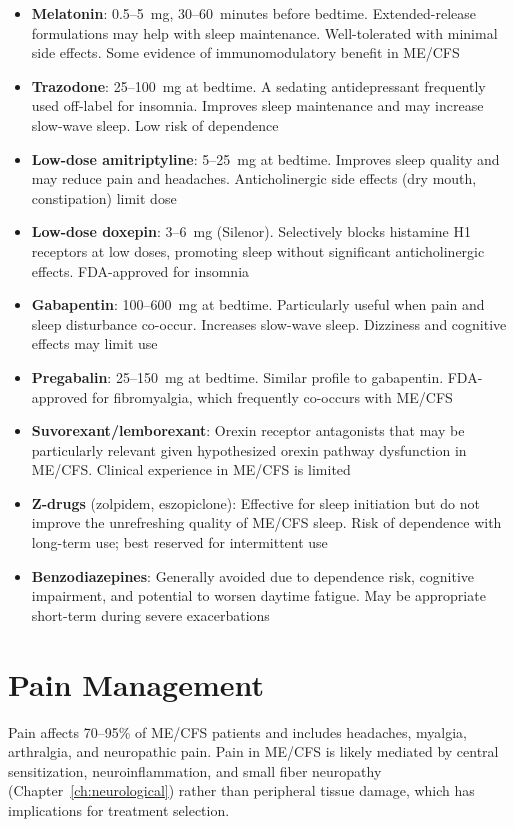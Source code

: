 \begin{itemize}
    \item \textbf{Melatonin}: 0.5--5~mg, 30--60~minutes before bedtime. Extended-release formulations may help with sleep maintenance. Well-tolerated with minimal side effects. Some evidence of immunomodulatory benefit in ME/CFS
    \item \textbf{Trazodone}: 25--100~mg at bedtime. A sedating antidepressant frequently used off-label for insomnia. Improves sleep maintenance and may increase slow-wave sleep. Low risk of dependence
    \item \textbf{Low-dose amitriptyline}: 5--25~mg at bedtime. Improves sleep quality and may reduce pain and headaches. Anticholinergic side effects (dry mouth, constipation) limit dose
    \item \textbf{Low-dose doxepin}: 3--6~mg (Silenor). Selectively blocks histamine H1 receptors at low doses, promoting sleep without significant anticholinergic effects. FDA-approved for insomnia
    \item \textbf{Gabapentin}: 100--600~mg at bedtime. Particularly useful when pain and sleep disturbance co-occur. Increases slow-wave sleep. Dizziness and cognitive effects may limit use
    \item \textbf{Pregabalin}: 25--150~mg at bedtime. Similar profile to gabapentin. FDA-approved for fibromyalgia, which frequently co-occurs with ME/CFS
    \item \textbf{Suvorexant/lemborexant}: Orexin receptor antagonists that may be particularly relevant given hypothesized orexin pathway dysfunction in ME/CFS. Clinical experience in ME/CFS is limited
    \item \textbf{Z-drugs} (zolpidem, eszopiclone): Effective for sleep initiation but do not improve the unrefreshing quality of ME/CFS sleep. Risk of dependence with long-term use; best reserved for intermittent use
    \item \textbf{Benzodiazepines}: Generally avoided due to dependence risk, cognitive impairment, and potential to worsen daytime fatigue. May be appropriate short-term during severe exacerbations
\end{itemize}

\section{Pain Management}
\label{sec:pain-management}

Pain affects 70--95\% of ME/CFS patients and includes headaches, myalgia, arthralgia, and neuropathic pain. Pain in ME/CFS is likely mediated by central sensitization, neuroinflammation, and small fiber neuropathy (Chapter~\ref{ch:neurological}) rather than peripheral tissue damage, which has implications for treatment selection.

